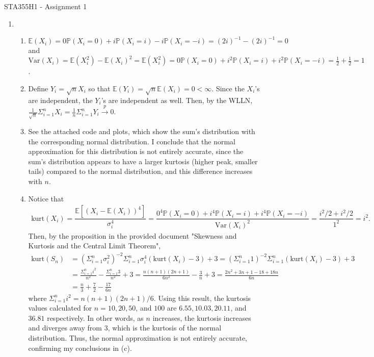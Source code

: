 \documentclass[12pt]{article}
\newcommand{\E}{\mathbb{E}}
\newcommand{\p}{\mathbb{P}}
\newcommand{\V}{\text{Var}}
\begin{document}
\begin{center}
{\Large STA355H1 - Assignment 1}
\end{center}

\begin{enumerate}
    \item
    \begin{enumerate}
        \item $\E(X_i) = 0\p(X_i = 0) + i\p(X_i = i) - i\p(X_i = -i) = (2i)^{-1} - (2i)^{-1} = 0$ and $\V(X_i) = \E(X_i^2) - \E(X_i)^2 = \E(X_i^2) = 0\p(X_i = 0) + i^2\p(X_i = i) + i^2\p(X_i = -i) = \frac{1}{2} + \frac{1}{2} = 1$.
        \item Define $Y_i = \sqrt{n}X_i$ so that $\E(Y_i) = \sqrt{n}\E(X_i) = 0 < \infty$. Since the $X_i$'s are independent, the $Y_i$'s are independent as well. Then, by the WLLN, $\frac{1}{\sqrt{n}}\Sigma_{i=1}^n X_i = \frac{1}{n}\Sigma_{i=1}^n Y_i \overset{p}{\to} 0$.
        \item See the attached code and plots, which show the sum's distribution with the corresponding normal distribution. I conclude that the normal approximation for this distribution is not entirely accurate, since the sum's distribution appears to have a larger kurtosis (higher peak, smaller tails) compared to the normal distribution, and this difference increases with $n$.
        \item Notice that
        \begin{align*}
            \text{kurt}(X_i) = \dfrac{\E[(X_i-\E(X_i))^4]}{\sigma_i^4} = \dfrac{0^4\p(X_i = 0) + i^4\p(X_i = i) + i^4\p(X_i = -i)}{\V(X_i)^2} = \dfrac{i^2/2 + i^2/2}{1^2} = i^2.
        \end{align*} Then, by the proposition in the provided document "Skewness and Kurtosis and the Central Limit Theorem",
        \begin{align*}
            \text{kurt}(S_n) &= (\Sigma_{i=1}^n \sigma_i^2)^{-2}\Sigma_{i=1}^n \sigma_i^4(\text{kurt}(X_i) - 3) + 3 = (\Sigma_{i=1}^n 1)^{-2}\Sigma_{i=1}^n (\text{kurt}(X_i) - 3) + 3\\
            &= \frac{\Sigma_{i=1}^n i^2}{n^2} - \frac{\Sigma_{i=1}^n 3}{n^2} + 3 = \frac{n(n+1)(2n+1)}{6n^2} - \frac{3}{n} + 3 = \frac{2n^2 + 3n + 1 - 18 + 18n}{6n}\\
            &= \frac{n}{3} + \frac{7}{2} - \frac{17}{6n}
        \end{align*} where $\Sigma_{i=1}^n i^2 = n(n+1)(2n+1)/6$. Using this result, the kurtosis values calculated for $n = 10, 20, 50$, and $100$ are $6.55, 10.03, 20.11$, and $36.81$ respectively. In other words, as $n$ increases, the kurtosis increases and diverges away from 3, which is the kurtosis of the normal distribution. Thus, the normal approximation is not entirely accurate, confirming my conclusions in (c).

\end{enumerate}
\end{enumerate}
\end{document}
